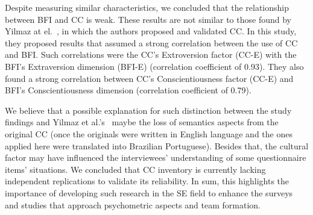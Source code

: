 Despite measuring similar characteristics, we concluded that the relationship between BFI and CC is weak. These results are not similar to those found by Yilmaz at el.~\cite{yilmaz2017examination}, in which the authors proposed and validated CC. In this study, they proposed results that assumed a strong correlation between the use of CC and BFI. Such correlations were the CC's Extroversion factor (CC-E) with the BFI's Extraversion dimension (BFI-E) (correlation coefficient of 0.93). They also found a strong correlation between CC's Conscientiousness factor (CC-E) and BFI's Conscientiousness dimension (correlation coefficient of 0.79).

We believe that a possible explanation for such distinction between the study findings and Yilmaz et al.'s~\cite{yilmaz2017examination} maybe the loss of semantics aspects from the original CC (once the originals were written in English language and the ones applied here were translated into Brazilian Portuguese). Besides that, the cultural factor may have influenced the interviewees' understanding of some questionnaire items' situations. We concluded that CC inventory is currently lacking independent replications to validate its reliability. In sum, this highlights the importance of developing such research in the SE field to enhance the surveys and studies that approach psychometric aspects and team formation. 











































